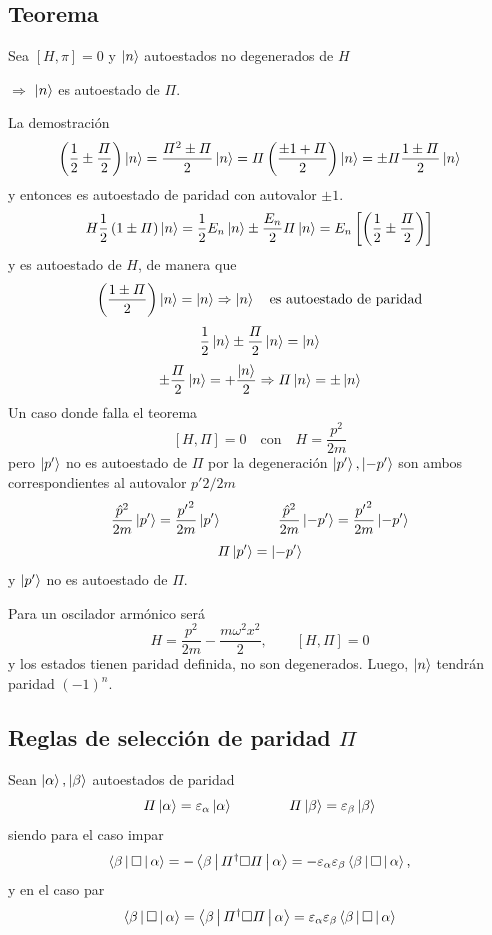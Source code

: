 \documentclass[10pt,oneside]{CBFT_book}
\begin{document}
\subsection{Teorema}

Sea $[H,\pi]=0$ y $\Ket{n}$ autoestados no degenerados de $H$ 

	$\Rightarrow$ $\Ket{n}$ es autoestado de $\Pi$.

La demostración 
\[
	\left(\frac{1}{2}\pm \frac{\Pi}{2}\right)\Ket{n} = \frac{\Pi^2\pm\Pi}{2}\Ket{n} = 
	\Pi \left( \frac{\pm 1+\Pi}{2}\right)\Ket{n} = \pm\Pi \frac{1\pm\Pi}{2}\Ket{n}
\]
y entonces es autoestado de paridad con autovalor $\pm 1$. 
\[
	H\frac{1}{2}\left(1\pm\Pi\right)\Ket{n} = \frac{1}{2}E_n\Ket{n} \pm \frac{E_n}{2}\Pi\Ket{n} =
	E_n\left[ \left( \frac{1}{2} \pm \frac{\Pi}{2}\right) \right]
\]
y es autoestado de $H$, de manera que 
\[
	\left( \frac{1\pm\Pi}{2}\right)\Ket{n} = \Ket{n} \Rightarrow \Ket{n} \quad \text{es autoestado de 
paridad}
\]
\[
	\frac{1}{2}\Ket{n} \pm \frac{\Pi}{2}\Ket{n} = \Ket{n}
\]
\[
	\pm \frac{\Pi}{2}\Ket{n} = +\frac{\Ket{n}}{2} \Rightarrow \Pi\Ket{n} = \pm\Ket{n}
\]
Un caso donde falla el teorema 
\[
	[H,\Pi]=0 \quad \text{con} \quad H=\frac{p^2}{2m} 
\]
pero $\Ket{p'}$ no es autoestado de $\Pi$ por la degeneración $\Ket{p'},\Ket{-p'}$ son ambos correspondientes 
al autovalor $p'2/2m$
\[
	\frac{\hat{p}^2}{2m}\Ket{p'} = \frac{{p'}^2}{2m}\Ket{p'} \qquad  \qquad 
	\frac{\hat{p}^2}{2m}\Ket{-p'} = \frac{{p'}^2}{2m}\Ket{-p'}
\]
\[
	\Pi\Ket{p'}= \Ket{-p'}
\]
y $\Ket{p'}$ no es autoestado de $\Pi$.

Para un oscilador armónico será
\[
	H = \frac{p^2}{2m} - \frac{m \omega^2 x^2}{2}, \qquad [H,\Pi] = 0
\]
y los estados tienen paridad definida, no son degenerados. Luego, $\Ket{n}$ tendrán paridad $(-1)^n$.

\subsection{Reglas de selección de paridad $\Pi$}

Sean $\Ket{\alpha}, \Ket{\beta}$ autoestados de paridad 
\[
	\Pi\Ket{\alpha} = \varepsilon_\alpha \Ket{\alpha} \qquad\qquad
	\Pi\Ket{\beta} = \varepsilon_\beta \Ket{\beta}
\]
siendo para el caso impar
\[
	\Braket{\beta|\Box|\alpha} = - \Braket{\beta|\Pi^\dagger\Box\Pi|\alpha} =
	-\varepsilon_\alpha \varepsilon_\beta \Braket{\beta|\Box|\alpha},
\]
y en el caso par
\[
	\Braket{\beta|\Box|\alpha} = \Braket{\beta|\Pi^\dagger\Box\Pi|\alpha} =
	\varepsilon_\alpha \varepsilon_\beta \Braket{\beta|\Box|\alpha}
\]
\end{document}
